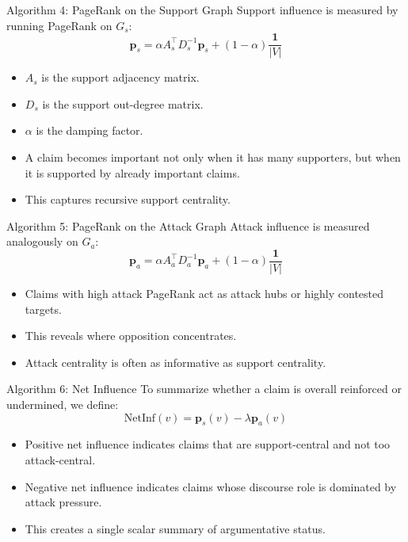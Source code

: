 \documentclass[aspectratio=169, 10pt]{beamer}
\begin{document}
\begin{frame}{Algorithm 4: PageRank on the Support Graph}
Support influence is measured by running PageRank on \(G_s\):
\[
\mathbf{p}_s = \alpha A_s^\top D_s^{-1}\mathbf{p}_s + (1-\alpha)\frac{\mathbf{1}}{|V|}
\]

\begin{itemize}
  \item \(A_s\) is the support adjacency matrix.
  \item \(D_s\) is the support out-degree matrix.
  \item \(\alpha\) is the damping factor.
\end{itemize}

\begin{itemize}
  \item A claim becomes important not only when it has many supporters, but when it is supported by already important claims.
  \item This captures recursive support centrality.
\end{itemize}
\end{frame}

\begin{frame}{Algorithm 5: PageRank on the Attack Graph}
Attack influence is measured analogously on \(G_a\):
\[
\mathbf{p}_a = \alpha A_a^\top D_a^{-1}\mathbf{p}_a + (1-\alpha)\frac{\mathbf{1}}{|V|}
\]

\begin{itemize}
  \item Claims with high attack PageRank act as attack hubs or highly contested targets.
  \item This reveals where opposition concentrates.
  \item Attack centrality is often as informative as support centrality.
\end{itemize}
\end{frame}

\begin{frame}{Algorithm 6: Net Influence}
To summarize whether a claim is overall reinforced or undermined, we define:
\[
\mathrm{NetInf}(v) = \mathbf{p}_s(v) - \lambda \mathbf{p}_a(v)
\]

\begin{itemize}
  \item Positive net influence indicates claims that are support-central and not too attack-central.
  \item Negative net influence indicates claims whose discourse role is dominated by attack pressure.
  \item This creates a single scalar summary of argumentative status.
\end{itemize}
\end{frame}
\end{document}
